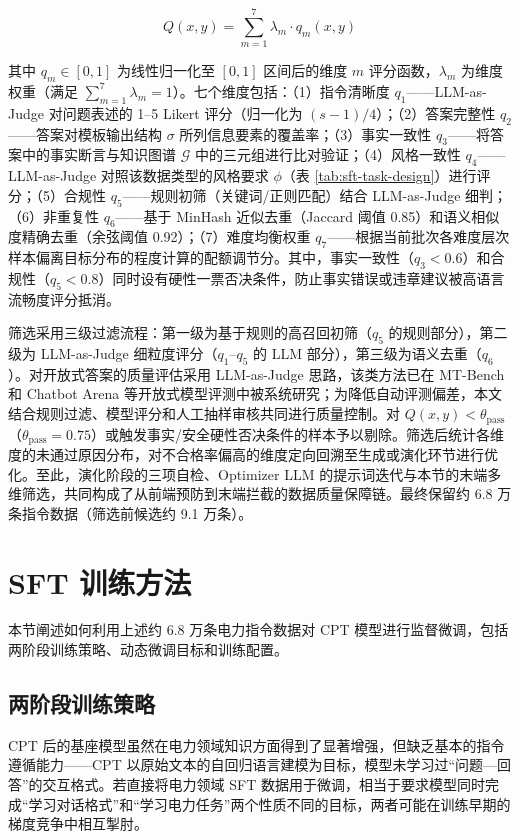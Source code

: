 \documentclass[fontset=fandol,type=master,campus=shenzhen,etitleauto=true]{hithesisbook}
\begin{document}
\begin{equation}
Q(x, y) = \sum_{m=1}^{7} \lambda_m \cdot q_m(x, y)
\end{equation}

其中 $q_m \in [0, 1]$ 为线性归一化至 $[0,1]$ 区间后的维度 $m$ 评分函数，$\lambda_m$ 为维度权重（满足 $\sum_{m=1}^{7}\lambda_m = 1$）。七个维度包括：（1）指令清晰度 $q_1$——LLM-as-Judge 对问题表述的 1--5 Likert 评分（归一化为 $(s-1)/4$）；（2）答案完整性 $q_2$——答案对模板输出结构 $\sigma$ 所列信息要素的覆盖率；（3）事实一致性 $q_3$——将答案中的事实断言与知识图谱 $\mathcal{G}$ 中的三元组进行比对验证；（4）风格一致性 $q_4$——LLM-as-Judge 对照该数据类型的风格要求 $\phi$（表 \ref{tab:sft-task-design}）进行评分；（5）合规性 $q_5$——规则初筛（关键词/正则匹配）结合 LLM-as-Judge 细判；（6）非重复性 $q_6$——基于 MinHash 近似去重（Jaccard 阈值 0.85）和语义相似度精确去重（余弦阈值 0.92）；（7）难度均衡权重 $q_7$——根据当前批次各难度层次样本偏离目标分布的程度计算的配额调节分。其中，事实一致性（$q_3 < 0.6$）和合规性（$q_5 < 0.8$）同时设有硬性一票否决条件，防止事实错误或违章建议被高语言流畅度评分抵消。

筛选采用三级过滤流程：第一级为基于规则的高召回初筛（$q_5$ 的规则部分），第二级为 LLM-as-Judge 细粒度评分（$q_1$--$q_5$ 的 LLM 部分），第三级为语义去重（$q_6$）。对开放式答案的质量评估采用 LLM-as-Judge 思路，该类方法已在 MT-Bench 和 Chatbot Arena 等开放式模型评测中被系统研究\cite{ref65}；为降低自动评测偏差，本文结合规则过滤、模型评分和人工抽样审核共同进行质量控制。对 $Q(x, y) < \theta_{\text{pass}}$（$\theta_{\text{pass}} = 0.75$）或触发事实/安全硬性否决条件的样本予以剔除。筛选后统计各维度的未通过原因分布，对不合格率偏高的维度定向回溯至生成或演化环节进行优化。至此，演化阶段的三项自检、Optimizer LLM 的提示词迭代与本节的末端多维筛选，共同构成了从前端预防到末端拦截的数据质量保障链。最终保留约 6.8 万条指令数据（筛选前候选约 9.1 万条）。

\section{SFT 训练方法}\label{sec:sft-train}

本节阐述如何利用上述约 6.8 万条电力指令数据对 CPT 模型进行监督微调，包括两阶段训练策略、动态微调目标和训练配置。

\subsection{两阶段训练策略}\label{ux4e24ux9636ux6bb5-sft-ux7b56ux7565}

CPT 后的基座模型虽然在电力领域知识方面得到了显著增强，但缺乏基本的指令遵循能力------CPT 以原始文本的自回归语言建模为目标，模型未学习过``问题---回答''的交互格式。若直接将电力领域 SFT 数据用于微调，相当于要求模型同时完成``学习对话格式''和``学习电力任务''两个性质不同的目标，两者可能在训练早期的梯度竞争中相互掣肘。
\end{document}
